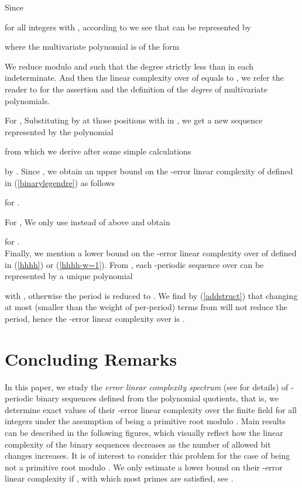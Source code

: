 \documentclass [11pt,a4paper]{article}
\begin{document}
Since

for all integers  with , according to \cite{AW06} we see that
 can be represented by

where the multivariate polynomial  is of the form

We reduce  modulo  and  such that the degree strictly less than  in each indeterminate.
And then the linear complexity over  of  equals to , we refer the reader to \cite[Theorem 8]{BEP} for the assertion and the definition of the \emph{degree} of multivariate polynomials.



For , Substituting  by  at those positions  with  in ,
we get a new sequence  represented by the polynomial

from which we derive after some simple calculations

by \cite[Theorem 8]{BEP}. Since , we obtain an upper bound on the -error linear complexity
of   defined in (\ref{binarylegendre}) as follows

for .



For , We only use  instead of  above and obtain

for .\\

Finally, we mention a lower bound on the -error linear complexity over  of 
defined in (\ref{hhhh})  or (\ref{hhhh-w=1}). From \cite[Theorem 8]{BEP}, each -periodic sequence over  can be represented by a unique polynomial

with , otherwise the period is reduced to . We find by (\ref{addstruct}) that
changing at most  (smaller than the weight of  per-period) terms from   will not reduce the period, hence
the -error linear complexity over  is .




\section{Concluding Remarks}

In this paper, we study the \emph{error linear complexity spectrum} (see \cite{EKKLP} for details) of
-periodic
binary sequences defined from the polynomial quotients, that is, we determine exact values of
their -error linear complexity over the finite field 
for all integers  under the assumption of  being a primitive root modulo . Main results can be described in the following figures, which visually reflect how the linear complexity of the binary sequences decreases as the number  of allowed bit changes increases. It is of interest to consider this problem for the case of  being not a primitive root modulo . We only estimate a lower bound on their -error linear complexity if , with which most primes  are satisfied, see \cite{CDP1997}.
\end{document}
